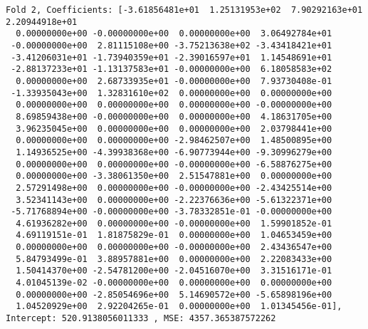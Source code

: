 \documentclass[11pt]{article}
\begin{document}
\begin{Verbatim}[commandchars=\\\{\}]
Fold 2, Coefficients: [-3.61856481e+01  1.25131953e+02  7.90292163e+01  2.20944918e+01
  0.00000000e+00 -0.00000000e+00  0.00000000e+00  3.06492784e+01
 -0.00000000e+00  2.81115108e+00 -3.75213638e+02 -3.43418421e+01
 -3.41206031e+01 -1.73940359e+01 -2.39016597e+01  1.14548691e+01
 -2.88137233e+01 -1.13137583e+01 -0.00000000e+00  6.18058583e+02
  0.00000000e+00  2.68733935e+01 -0.00000000e+00  7.93730408e-01
 -1.33935043e+00  1.32831610e+02  0.00000000e+00  0.00000000e+00
  0.00000000e+00  0.00000000e+00  0.00000000e+00 -0.00000000e+00
  8.69859438e+00 -0.00000000e+00  0.00000000e+00  4.18631705e+00
  3.96235045e+00  0.00000000e+00  0.00000000e+00  2.03798441e+00
  0.00000000e+00  0.00000000e+00 -2.98462507e+00  1.48500895e+00
  1.14936525e+00 -4.39938368e+00 -6.90773944e+00 -9.30996279e+00
  0.00000000e+00  0.00000000e+00 -0.00000000e+00 -6.58876275e+00
  0.00000000e+00 -3.38061350e+00  2.51547881e+00  0.00000000e+00
  2.57291498e+00  0.00000000e+00 -0.00000000e+00 -2.43425514e+00
  3.52341143e+00  0.00000000e+00 -2.22376636e+00 -5.61322371e+00
 -5.71768894e+00 -0.00000000e+00 -3.78332851e-01 -0.00000000e+00
  4.61936282e+00  0.00000000e+00 -0.00000000e+00  1.59901852e-01
  4.69119151e-01  1.81875829e-01  0.00000000e+00  1.04653459e+00
  0.00000000e+00  0.00000000e+00 -0.00000000e+00  2.43436547e+00
  5.84793499e-01  3.88957881e+00  0.00000000e+00  2.22083433e+00
  1.50414370e+00 -2.54781200e+00 -2.04516070e+00  3.31516171e-01
  4.01045139e-02 -0.00000000e+00  0.00000000e+00  0.00000000e+00
  0.00000000e+00 -2.85054696e+00  5.14690572e+00 -5.65898196e+00
  1.04520929e+00  2.92204265e-01  0.00000000e+00  1.01345456e-01], Intercept: 520.9138056011333 , MSE: 4357.365387572262 


\end{Verbatim}
\end{document}
